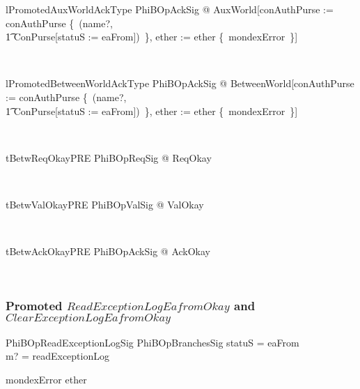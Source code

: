 \begin{LNewLemma}
\begin{theorem}{lPromotedAuxWorldAckType}
    \forall PhiBOpAckSig @ AuxWorld[conAuthPurse := conAuthPurse \oplus \{~(name?, \\
        \t1 \theta ConPurse[statuS := eaFrom])~\}, ether := ether \cup \{~mondexError~\}]
\end{theorem}~\end{LNewLemma}

\begin{LNewLemma}
\begin{theorem}{lPromotedBetweenWorldAckType}
    \forall PhiBOpAckSig @ BetweenWorld[conAuthPurse := conAuthPurse \oplus \{~(name?, \\
        \t1 \theta ConPurse[statuS := eaFrom])~\}, ether := ether \cup \{~mondexError~\}]
\end{theorem}~\end{LNewLemma}

\begin{LNewThm}
\begin{theorem}{tBetwReqOkayPRE}
   \forall PhiBOpReqSig @ \pre ReqOkay
\end{theorem}~\end{LNewThm}

\begin{LNewThm}
\begin{theorem}{tBetwValOkayPRE}
   \forall PhiBOpValSig  @ \pre ValOkay
\end{theorem}~\end{LNewThm}

\begin{LNewThm}
\begin{theorem}{tBetwAckOkayPRE}
   \forall PhiBOpAckSig @ \pre AckOkay
\end{theorem}~\end{LNewThm}

\subsubsection{Promoted $ReadExceptionLogEafromOkay$ and $ClearExceptionLogEafromOkay$}

\begin{LNewSDef}
\begin{schema}{PhiBOpReadExceptionLogSig}
    PhiBOpBranchesSig
\where
    statuS = eaFrom \\
    m? = readExceptionLog
    \also

    mondexError \in ether
\end{schema}~\end{LNewSDef}

